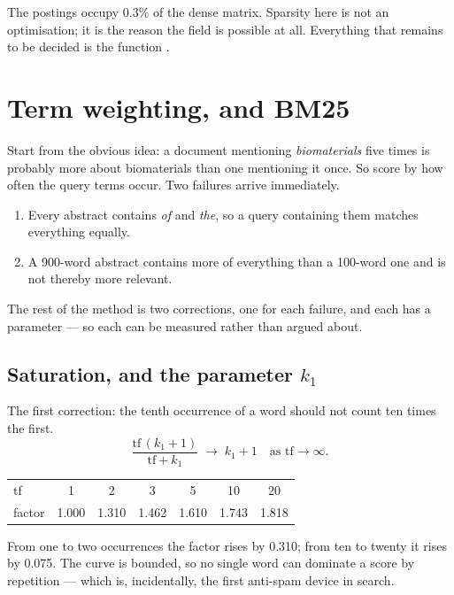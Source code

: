 \documentclass[11pt,a4paper]{article}
\begin{document}
The postings occupy 0.3\% of the dense matrix. Sparsity here is not an
optimisation; it is the reason the field is possible at all. Everything that
remains to be decided is the function .

\section{Term weighting, and BM25}

Start from the obvious idea: a document mentioning \emph{biomaterials} five
times is probably more about biomaterials than one mentioning it once. So score
by how often the query terms occur. Two failures arrive immediately.

\begin{enumerate}[leftmargin=*]
  \item {} Every abstract contains \emph{of} and
        \emph{the}, so a query containing them matches everything equally.
  \item {} A 900-word abstract contains more of
        everything than a 100-word one and is not thereby more relevant.
\end{enumerate}

The rest of the method is two corrections, one for each failure, and each has a
parameter --- so each can be measured rather than argued about.

\subsection{Saturation, and the parameter $k_1$}

The first correction: the tenth occurrence of a word should not count ten times
the first.
\[
  \frac{\text{tf}\,(k_1+1)}{\text{tf} + k_1} \;\longrightarrow\; k_1 + 1
  \quad\text{as tf}\to\infty .
\]

\begin{center}
\small
\begin{tabular}{lcccccc}
\toprule
tf     & 1 & 2 & 3 & 5 & 10 & 20 \\
factor & 1.000 & 1.310 & 1.462 & 1.610 & 1.743 & 1.818 \\
\bottomrule
\end{tabular}
\end{center}

From one to two occurrences the factor rises by 0.310; from ten to twenty it
rises by 0.075. The curve is bounded, so no single word can dominate a score by
repetition --- which is, incidentally, the first anti-spam device in search.
\end{document}
